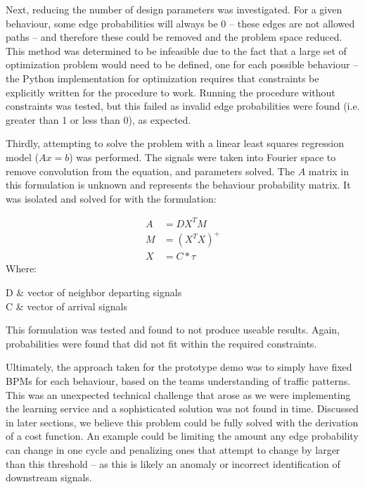 \documentclass{report}
\makeatletter
\newenvironment{conditions*}
  {\par\vspace{\abovedisplayskip}\noindent\begin{tabular}{>{$}l<{$} @{${}={}$} l}}
  {\end{tabular}\par\vspace{\belowdisplayskip}}
\makeatother
\begin{document}
Next, reducing the number of design parameters was investigated. 
For a given behaviour, some edge probabilities will always be 0 – these edges are not allowed paths – and therefore these could be removed and the problem space reduced. 
This method was determined to be infeasible due to the fact that a large set of optimization problem would need to be defined, one for each possible behaviour – the Python implementation for optimization requires that constraints be explicitly written for the procedure to work. 
Running the procedure without constraints was tested, but this failed as invalid edge probabilities were found (i.e. greater than 1 or less than 0), as expected.

Thirdly, attempting to solve the problem with a linear least squares regression model ($Ax=b$) was performed. 
The signals were taken into Fourier space to remove convolution from the equation, and parameters solved. 
The $A$ matrix in this formulation is unknown and represents the behaviour probability matrix. 
It was isolated and solved for with the formulation:

\begin{align}
	A& = DX^{T}M \\
	M& = (X^{T}X)^{+} \\
	X& = C \ast \tau
\end{align}
Where:
\begin{conditions*}
D & vector of neighbor departing signals \\
C & vector of arrival signals
\end{conditions*}

This formulation was tested and found to not produce useable results. 
Again, probabilities were found that did not fit within the required constraints.

Ultimately, the approach taken for the prototype demo was to simply have fixed BPMs for each behaviour, based on the teams understanding of traffic patterns. 
This was an unexpected technical challenge that arose as we were implementing the learning service and a sophisticated solution was not found in time. 
Discussed in later sections, we believe this problem could be fully solved with the derivation of a cost function. 
An example could be limiting the amount any edge probability can change in one cycle and penalizing ones that attempt to change by larger than this threshold – as this is likely an anomaly or incorrect identification of downstream signals.
\end{document}
